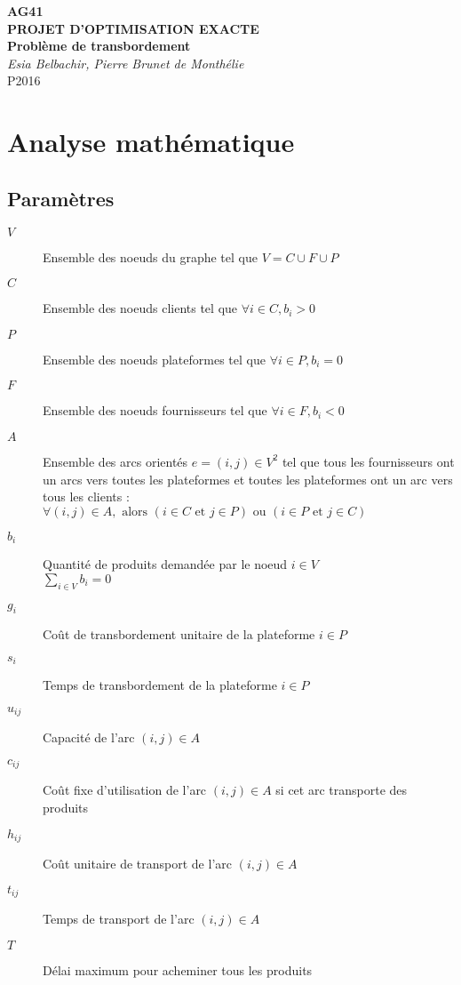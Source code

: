 \documentclass[a4paper,12pt]{article}
\begin{document}
\begin{titlepage}
    \centering
    \vspace*{\fill}
	{\huge\bfseries AG41\\[0.3cm]}
	{\LARGE\bfseries PROJET D'OPTIMISATION EXACTE\\}
	{\LARGE\bfseries Problème de transbordement\\[0.5cm]}
	{\Large\itshape Esia Belbachir, Pierre Brunet de Monthélie\\[0.5cm]}
    {\large P2016\\[1cm]}
\vspace*{\fill}
\end{titlepage}

\newpage
\tableofcontents
\listoffigures
\newpage

\section{Analyse mathématique}

\subsection{Paramètres}

\begin{description}
 \item[$V$] Ensemble des noeuds du graphe tel que $V = C \cup F \cup P$
  \item[$C$] Ensemble des noeuds clients tel que $\forall i \in C, b_i > 0$
 \item[$P$] Ensemble des noeuds plateformes tel que $\forall i \in P, b_i = 0$
 \item[$F$] Ensemble des noeuds fournisseurs tel que $\forall i \in F, b_i < 0$
 \item[$A$] Ensemble des arcs orientés $e = (i,j) \in V^2$ tel que tous les fournisseurs ont un arcs vers toutes les plateformes et toutes les plateformes ont un arc vers tous les clients :\\
 $\forall (i,j) \in A, \mbox{ alors } (i \in C \mbox{ et }j \in P) \mbox{ ou }(i \in P\mbox{ et }j \in C)$
 \item[$b_i$] Quantité de produits demandée par le noeud $i \in V$ \\ $\sum\limits_{i \in V} b_i = 0$
 \item[$g_i$] Coût de transbordement unitaire de la plateforme $i \in P$
 \item[$s_i$] Temps de transbordement de la plateforme $i \in P$
 \item[$u_{ij}$] Capacité de l'arc $(i,j) \in A$
 \item[$c_{ij}$] Coût fixe d'utilisation de l'arc $(i,j) \in A$ si cet arc transporte des produits
 \item[$h_{ij}$] Coût unitaire de transport de l'arc $(i,j) \in A$
 \item[$t_{ij}$] Temps de transport de l'arc $(i,j) \in A$
 \item[$T$] Délai maximum pour acheminer tous les produits
\end{description}
\end{document}
